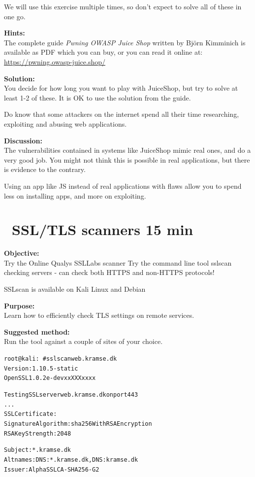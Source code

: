 \documentclass[a4paper,11pt,notitlepage]{report}
\begin{document}
We will use this exercise multiple times, so don't expect to solve all of these in one go.

{\bf Hints:}\\
The complete guide \emph{Pwning OWASP Juice Shop} written by Björn Kimminich is available as PDF which you can buy, or you can read it online at:\\
\url{https://pwning.owasp-juice.shop/}


 {\bf Solution:}\\
 You decide for how long you want to play with JuiceShop, but try to solve at least 1-2 of these. It is OK to use the solution from the guide.

 Do know that some attackers on the internet spend all their time researching, exploiting and abusing web applications.

 {\bf Discussion:}\\
The vulnerabilities contained in systems like JuiceShop mimic real ones, and do a very good job. You might not think this is possible in real applications, but there is evidence to the contrary.

Using an app like JS instead of real applications with flaws allow you to spend less on installing apps, and more on exploiting.

\chapter{\faInfoCircle\ SSL/TLS scanners 15 min}
\label{ex:sslscan}

{\bf Objective:}\\
Try the Online Qualys SSLLabs scanner 
Try the command line tool sslscan checking servers - can check both HTTPS and non-HTTPS protocols!

SSLscan is available on Kali Linux and Debian

{\bf Purpose:}\\
Learn how to efficiently check TLS settings on remote services.

{\bf Suggested method:}\\
Run the tool against a couple of sites of your choice.

\begin{alltt}\small
root@kali:~# sslscan web.kramse.dk
Version: 1.10.5-static
OpenSSL 1.0.2e-dev xx XXX xxxx

Testing SSL server web.kramse.dk on port 443
...
  SSL Certificate:
Signature Algorithm: sha256WithRSAEncryption
RSA Key Strength:    2048

Subject:  *.kramse.dk
Altnames: DNS:*.kramse.dk, DNS:kramse.dk
Issuer:   AlphaSSL CA - SHA256 - G2
\end{alltt}
\end{document}
